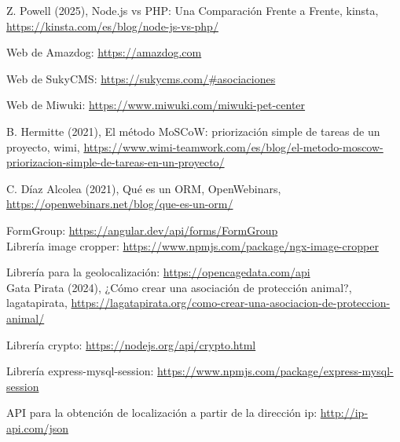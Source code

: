 \begin{thebibliography}{9}
Z. Powell (2025), Node.js vs PHP: Una Comparación Frente a Frente, kinsta, \href{https://kinsta.com/es/blog/node-js-vs-php/}{https://kinsta.com/es/blog/node-js-vs-php/}

Web de Amazdog: \href{https://amazdog.com}{https://amazdog.com}

Web de SukyCMS: \href{https://sukycms.com/\#asociaciones}{https://sukycms.com/\#asociaciones}

Web de Miwuki: \href{https://www.miwuki.com/miwuki-pet-center}{https://www.miwuki.com/miwuki-pet-center}

B. Hermitte (2021), El método MoSCoW: priorización simple de tareas de un proyecto, wimi, \href{https://www.wimi-teamwork.com/es/blog/el-metodo-moscow-priorizacion-simple-de-tareas-en-un-proyecto/}{https://www.wimi-teamwork.com/es/blog/el-metodo-moscow-priorizacion-simple-de-tareas-en-un-proyecto/}

C. Díaz Alcolea (2021), Qué es un ORM, OpenWebinars, \href{https://openwebinars.net/blog/que-es-un-orm/}{https://openwebinars.net/blog/que-es-un-orm/}

FormGroup: \href{https://angular.dev/api/forms/FormGroup}{https://angular.dev/api/forms/FormGroup}\\


Librería image cropper: \href{https://www.npmjs.com/package/ngx-image-cropper}{https://www.npmjs.com/package/ngx-image-cropper}

Librería para la geolocalización: \href{https://opencagedata.com/api}{https://opencagedata.com/api}\\

 Gata Pirata (2024), ¿Cómo crear una asociación de protección animal?, lagatapirata, \href{https://lagatapirata.org/como-crear-una-asociacion-de-proteccion-animal/}{https://lagatapirata.org/como-crear-una-asociacion-de-proteccion-animal/}

 Librería crypto: \href{https://nodejs.org/api/crypto.html}{https://nodejs.org/api/crypto.html}


 Librería express-mysql-session: \href{https://www.npmjs.com/package/express-mysql-session}{https://www.npmjs.com/package/express-mysql-session}

API para la obtención de localización a partir de la dirección ip: \href{http://ip-api.com/json}{http://ip-api.com/json}

\end{thebibliography}